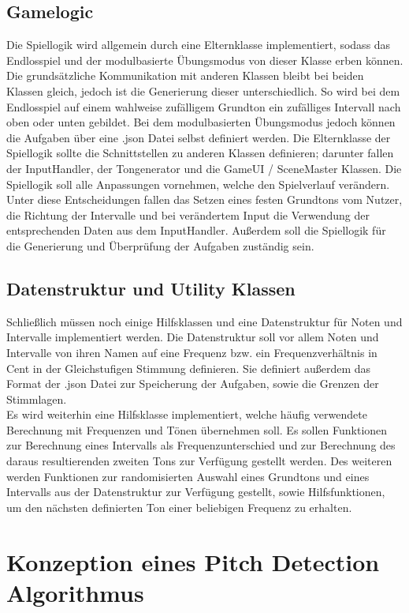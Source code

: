\subsection{Gamelogic}
Die Spiellogik wird allgemein durch eine Elternklasse implementiert, sodass das Endlosspiel und der modulbasierte Übungsmodus von dieser Klasse erben können. Die grundsätzliche Kommunikation mit anderen Klassen bleibt bei beiden Klassen gleich, jedoch ist die Generierung dieser unterschiedlich. So wird bei dem Endlosspiel auf einem wahlweise zufälligem Grundton ein zufälliges Intervall nach oben oder unten gebildet. Bei dem modulbasierten Übungsmodus jedoch können die Aufgaben über eine .json Datei selbst definiert werden. Die Elternklasse der Spiellogik sollte die Schnittstellen zu anderen Klassen definieren; darunter fallen der InputHandler, der Tongenerator und die GameUI / SceneMaster Klassen. Die Spiellogik soll alle Anpassungen vornehmen, welche den Spielverlauf verändern. Unter diese Entscheidungen fallen das Setzen eines festen Grundtons vom Nutzer, die Richtung der Intervalle und bei verändertem Input die Verwendung der entsprechenden Daten aus dem InputHandler. Außerdem soll die Spiellogik für die Generierung und Überprüfung der Aufgaben zuständig sein.

\subsection{Datenstruktur und Utility Klassen}
Schließlich müssen noch einige Hilfsklassen und eine Datenstruktur für Noten und Intervalle implementiert werden. Die Datenstruktur soll vor allem Noten und Intervalle von ihren Namen auf eine Frequenz bzw. ein Frequenzverhältnis in Cent in der Gleichstufigen Stimmung definieren. Sie definiert außerdem das Format der .json Datei zur Speicherung der Aufgaben, sowie die Grenzen der Stimmlagen. \\ 
Es wird weiterhin eine Hilfsklasse implementiert, welche häufig verwendete Berechnung mit Frequenzen und Tönen übernehmen soll. Es sollen Funktionen zur Berechnung eines Intervalls als Frequenzunterschied und zur Berechnung des daraus resultierenden zweiten Tons zur Verfügung gestellt werden. Des weiteren werden Funktionen zur randomisierten Auswahl eines Grundtons und eines Intervalls aus der Datenstruktur zur Verfügung gestellt, sowie Hilfsfunktionen, um den nächsten definierten Ton einer beliebigen Frequenz zu erhalten.

\section{Konzeption eines Pitch Detection Algorithmus}


